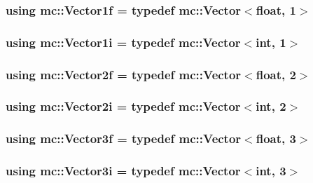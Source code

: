 \subsubsection[{\texorpdfstring{Vector1f}{Vector1f}}]{\setlength{\rightskip}{0pt plus 5cm}using {\bf mc\+::\+Vector1f} = typedef {\bf mc\+::\+Vector}$<$float, 1$>$}\hypertarget{namespacemc_a189909477b1267500c9b30cf606df884}{}\label{namespacemc_a189909477b1267500c9b30cf606df884}
\subsubsection[{\texorpdfstring{Vector1i}{Vector1i}}]{\setlength{\rightskip}{0pt plus 5cm}using {\bf mc\+::\+Vector1i} = typedef {\bf mc\+::\+Vector}$<$int, 1$>$}\hypertarget{namespacemc_a6be7455b4341d989d713cfd9387b47ed}{}\label{namespacemc_a6be7455b4341d989d713cfd9387b47ed}
\subsubsection[{\texorpdfstring{Vector2f}{Vector2f}}]{\setlength{\rightskip}{0pt plus 5cm}using {\bf mc\+::\+Vector2f} = typedef {\bf mc\+::\+Vector}$<$float, 2$>$}\hypertarget{namespacemc_a58c645c7ce4d8e1b71ae618f37f8a162}{}\label{namespacemc_a58c645c7ce4d8e1b71ae618f37f8a162}
\subsubsection[{\texorpdfstring{Vector2i}{Vector2i}}]{\setlength{\rightskip}{0pt plus 5cm}using {\bf mc\+::\+Vector2i} = typedef {\bf mc\+::\+Vector}$<$int, 2$>$}\hypertarget{namespacemc_a9d370d4e850e128d4c7ca446fd785a0d}{}\label{namespacemc_a9d370d4e850e128d4c7ca446fd785a0d}
\subsubsection[{\texorpdfstring{Vector3f}{Vector3f}}]{\setlength{\rightskip}{0pt plus 5cm}using {\bf mc\+::\+Vector3f} = typedef {\bf mc\+::\+Vector}$<$float, 3$>$}\hypertarget{namespacemc_ae4429bda568885c31776f449138faba0}{}\label{namespacemc_ae4429bda568885c31776f449138faba0}
\subsubsection[{\texorpdfstring{Vector3i}{Vector3i}}]{\setlength{\rightskip}{0pt plus 5cm}using {\bf mc\+::\+Vector3i} = typedef {\bf mc\+::\+Vector}$<$int, 3$>$}\hypertarget{namespacemc_a4d62b05faba771617b95b5b75b6f15c3}{}\label{namespacemc_a4d62b05faba771617b95b5b75b6f15c3}
